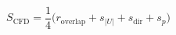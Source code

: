 \documentclass[12pt]{article}
\begin{document}
\begin{equation*}
S_{\text{CFD}} = \frac{1}{4}\bigl(r_{\text{overlap}} + s_{|U|} + s_{\text{dir}} + s_p\bigr)
\end{equation*}
\end{document}
